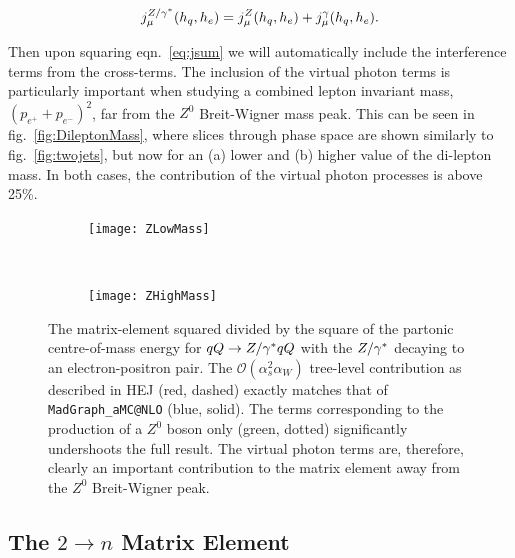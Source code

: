 		\begin{align}
			\label{eq:jsum}
			j^{Z/\gamma^*}_\mu(h_q,h_e) = j^Z_\mu(h_q,h_e) + j^\gamma_\mu(h_q,h_e).
		\end{align}

		Then upon squaring eqn.~\eqref{eq:jsum} we will automatically include the interference
		terms from the cross-terms. The inclusion of the virtual photon terms is particularly
		important when studying a combined lepton invariant mass, $(p_{e^+} + p_{e^-})^2$,
		far from the $Z^0$ Breit-Wigner mass peak. This can be seen in fig.~\eqref{fig:DileptonMass},
		where slices through phase space are shown similarly to fig.~\eqref{fig:twojets}, but
		now for an (a) lower and (b) higher value of the di-lepton mass.  In both cases, the
		contribution of the virtual photon processes is above 25\%.

		\begin{figure}[hbtp]
		        \centering
		        \begin{subfigure}[b]{0.78\textwidth}
		                \texttt{[image: ZLowMass]}
		                \caption{}
		                \label{fig:LowDileptonMass}
		        \end{subfigure}
		        ~
		        \begin{subfigure}[b]{0.78\textwidth}
		                \texttt{[image: ZHighMass]}
		                \caption{}
		                \label{fig:HighDileptonMass}
		        \end{subfigure}
		        \caption{The matrix-element squared divided by the square of the
		          partonic centre-of-mass energy for $qQ\to Z/\gamma^* qQ$ with the $Z/\gamma^*$ decaying
		          to an electron-positron pair.  The
		          $\mathcal{O}(\alpha_s^2 \alpha_W)$ tree-level contribution
		          as described in HEJ (red, dashed) exactly matches that of
		          \texttt{MadGraph\_aMC@NLO} (blue, solid).  The terms corresponding to the production
		          of a $Z^0$ boson only (green, dotted) significantly undershoots the
		          full result.  The
		          virtual photon terms are, therefore, clearly an important
		          contribution to the matrix element away from the $Z^0$ Breit-Wigner
		          peak.}
		        \label{fig:DileptonMass}
		\end{figure}

	\subsection{The $2\rightarrow n$ Matrix Element}

